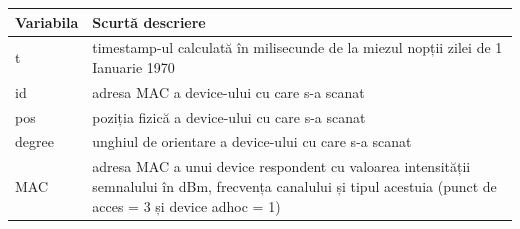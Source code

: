 \documentclass[]{article}
\begin{document}
\begin{longtable}[]{@{}ll@{}}
\toprule
\begin{minipage}[b]{0.10\columnwidth}\raggedright\strut
Variabila\strut
\end{minipage} & \begin{minipage}[b]{0.63\columnwidth}\raggedright\strut
Scurtă descriere\strut
\end{minipage}\tabularnewline
\midrule
\endhead
\begin{minipage}[t]{0.10\columnwidth}\raggedright\strut
t\strut
\end{minipage} & \begin{minipage}[t]{0.63\columnwidth}\raggedright\strut
timestamp-ul calculată în milisecunde de la miezul nopții zilei de 1
Ianuarie 1970\strut
\end{minipage}\tabularnewline
\begin{minipage}[t]{0.10\columnwidth}\raggedright\strut
id\strut
\end{minipage} & \begin{minipage}[t]{0.63\columnwidth}\raggedright\strut
adresa MAC a device-ului cu care s-a scanat\strut
\end{minipage}\tabularnewline
\begin{minipage}[t]{0.10\columnwidth}\raggedright\strut
pos\strut
\end{minipage} & \begin{minipage}[t]{0.63\columnwidth}\raggedright\strut
poziția fizică a device-ului cu care s-a scanat\strut
\end{minipage}\tabularnewline
\begin{minipage}[t]{0.10\columnwidth}\raggedright\strut
degree\strut
\end{minipage} & \begin{minipage}[t]{0.63\columnwidth}\raggedright\strut
unghiul de orientare a device-ului cu care s-a scanat\strut
\end{minipage}\tabularnewline
\begin{minipage}[t]{0.10\columnwidth}\raggedright\strut
MAC\strut
\end{minipage} & \begin{minipage}[t]{0.63\columnwidth}\raggedright\strut
adresa MAC a unui device respondent cu valoarea intensității semnalului
în dBm, frecvența canalului și tipul acestuia (punct de acces = 3 și
device adhoc = 1)\strut
\end{minipage}\tabularnewline
\bottomrule
\end{longtable}
\end{document}

